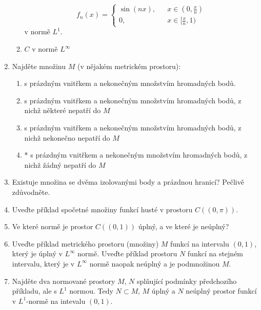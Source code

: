 \begin{enumerate}
\begin{enumerate}
                        \[ f_n(x)=\left\{\begin{aligned}
                                                \sin(nx), &&x\in(0,\frac x n)\\
                                                0,                &&x\in[\frac x n,1)                   
                                         \end{aligned}\right.\]
                         v normě $L^1$.
                \item $C$ v normě $L^\infty$
        \end{enumerate}
 \item Najděte množinu $M$ (v nějakém metrickém prostoru):
        \begin{enumerate}
                \item s prázdným vnitřkem a nekonečným množstvím hromadných bodů.
                \item s prázdným vnitřkem a nekonečným množstvím hromadných bodů, z nichž některé
                nepatří do $M$
                \item s prázdným vnitřkem a nekonečným množstvím hromadných bodů, z nichž nekonečno
                nepatří do $M$
                \item * s prázdným vnitřkem a nekonečným množstvím hromadných bodů, z nichž žádný
                nepatří do $M$
        \end{enumerate}
        \item Existuje množina se dvěma izolovanými body a prázdnou hranicí? Pečlivě zdůvodněte.
\item Uveďte příklad spočetné množiny funkcí husté v prostoru $C((0,\pi))$.
 \item Ve které normě je prostor $C((0,1))$ úplný, a ve které je neúplný?
 \item Uveďte příklad metrického prostoru (množiny) $M$ funkcí na intervalu $(0,1)$, který je úplný v
       $L^\infty$ normě. Uveďte příklad prostoru $N$ funkcí na stejném intervalu, který je v
       $L^\infty$ normě naopak neúplný a je podmnožinou $M$.
  \item Najděte dva normované prostory $M$, $N$ splňující podmínky předchozího příkladu, ale s $L^1$
                normou. Tedy $N\subset M$, $M$ úplný a $N$ neúplný prostor funkcí v $L^1$-normě
                na intevalu $(0,1)$.
\end{enumerate}


